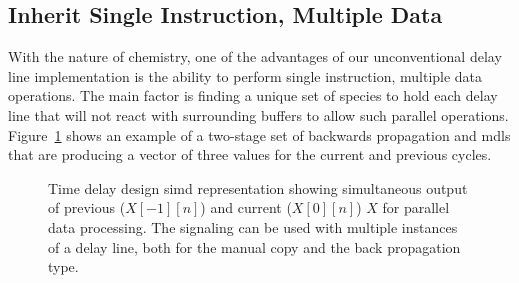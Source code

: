 \subsection{Inherit Single Instruction, Multiple Data}
With the nature of chemistry, one of the advantages of our unconventional delay line implementation is the ability to perform single instruction, multiple data~\cite{Flynn1972-sd} operations. The main factor is finding a unique set of species to hold each delay line that will not react with surrounding buffers to allow such parallel operations. Figure~\ref{fig:simd} shows an example of a two-stage set of backwards propagation and \glspl{mdl} that are producing a vector of three values for the current and previous cycles.

\begin{figure}[ht]
	\centering
	\caption[Single Instruction, Multiple Data Representation with Delay Line]{Time delay design \gls{simd} representation showing simultaneous output of previous ($X[-1][n]$) and current ($X[0][n]$) $X$ for parallel data processing. The signaling can be used with multiple instances of a delay line, both for the manual copy and the back propagation type.}
	\label{fig:simd}
\end{figure}

